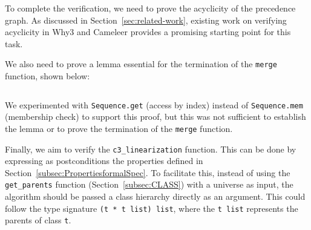 \documentclass[runningheads]{llncs}
\begin{document}
To complete the verification, we need to prove the acyclicity of the precedence graph. 
As discussed in Section~\ref{sec:related-work}, existing work on verifying acyclicity in Why3 and Cameleer provides a promising starting point for this task.

We also need to prove a lemma essential for the termination of the \texttt{merge} function, shown below:

\inputminted[firstline=151,lastline=158,fontsize=\small,linenos,xleftmargin=20pt]{ocaml}{../c3/cameleer/c3.ml}

We experimented with \texttt{Sequence.get} (access by index) instead of \texttt{Sequence.mem} 
(membership check) to support this proof, 
but this was not sufficient to establish the lemma or to prove the termination of the \texttt{merge} function.

Finally, we aim to verify the \texttt{c3\_linearization} function. This can be done by expressing as postconditions the 
properties defined in Section~\ref{subsec:PropertiesformalSpec}. To facilitate this, instead of using the \texttt{get\_parents} function (Section~\ref{subsec:CLASS}) with a universe as input, 
the algorithm should be passed a class hierarchy directly as an argument. This could follow the type signature \texttt{(t * t list) list}, where the \texttt{t list} represents the parents of class \texttt{t}.
\printbibliography
\end{document}
